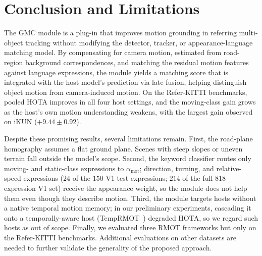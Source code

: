 \documentclass{article}
\begin{document}
\section{Conclusion and Limitations}
\label{sec:conclusion}
The GMC module is a plug-in that improves motion grounding in referring multi-object tracking without modifying the detector, tracker, or appearance-language matching model. By compensating for camera motion, estimated from road-region background correspondences, and matching the residual motion features against language expressions, the module yields a matching score that is integrated with the host model's prediction via late fusion, helping distinguish object motion from camera-induced motion. On the Refer-KITTI benchmarks, pooled HOTA improves in all four host settings, and the moving-class gain grows as the host's own motion understanding weakens, with the largest gain observed on iKUN ($+9.44\pm0.92$).

Despite these promising results, several limitations remain. First, the road-plane homography assumes a flat ground plane. Scenes with steep slopes or uneven terrain fall outside the model's scope. Second, the keyword classifier routes only moving- and static-class expressions to $\alpha_{\mathrm{mot}}$; direction, turning, and relative-speed expressions ($24$ of the $150$ V1 test expressions; $214$ of the full 818-expression V1 set) receive the appearance weight, so the module does not help them even though they describe motion. Third, the module targets hosts without a native temporal motion memory; in our preliminary experiments, cascading it onto a temporally-aware host (TempRMOT~\cite{temprmot}) degraded HOTA, so we regard such hosts as out of scope. Finally, we evaluated three RMOT frameworks but only on the Refer-KITTI benchmarks. Additional evaluations on other datasets are needed to further validate the generality of the proposed approach.



\end{document}
